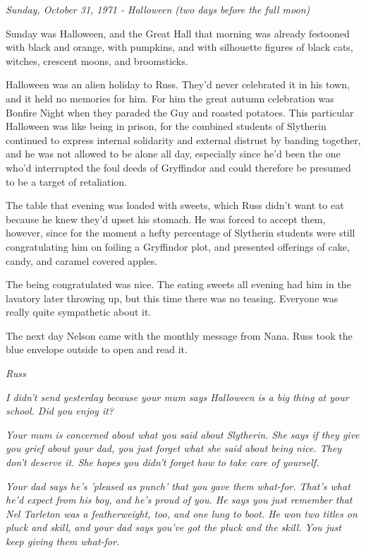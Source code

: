 \documentclass[a4paper,11pt]{article}
\begin{document}
\emph{Sunday, October 31, 1971 - Halloween (two days before the full moon)}

Sunday was Halloween, and the Great Hall that morning was already festooned with black and orange, with pumpkins, and with silhouette figures of black cats, witches, crescent moons, and broomsticks.

Halloween was an alien holiday to Russ. They'd never celebrated it in his town, and it held no memories for him. For him the great autumn celebration was Bonfire Night when they paraded the Guy and roasted potatoes. This particular Halloween was like being in prison, for the combined students of Slytherin continued to express internal solidarity and external distrust by banding together, and he was not allowed to be alone all day, especially since he'd been the one who'd interrupted the foul deeds of Gryffindor and could therefore be presumed to be a target of retaliation.

The table that evening was loaded with sweets, which Russ didn't want to eat because he knew they'd upset his stomach. He was forced to accept them, however, since for the moment a hefty percentage of Slytherin students were still congratulating him on foiling a Gryffindor plot, and presented offerings of cake, candy, and caramel covered apples.

The being congratulated was nice. The eating sweets all evening had him in the lavatory later throwing up, but this time there was no teasing. Everyone was really quite sympathetic about it.

The next day Nelson came with the monthly message from Nana. Russ took the blue envelope outside to open and read it.

\emph{Russ}

\emph{I didn't send yesterday because your mum says Halloween is a big thing at your school. Did you enjoy it?}

\emph{Your mum is concerned about what you said about Slytherin. She says if they give you grief about your dad, you just forget what she said about being nice. They don't deserve it. She hopes you didn't forget how to take care of yourself.}

\emph{Your dad says he's 'pleased as punch' that you gave them what-for. That's what he'd expect from his boy, and he's proud of you. He says you just remember that Nel Tarleton was a featherweight, too, and one lung to boot. He won two titles on pluck and skill, and your dad says you've got the pluck and the skill. You just keep giving them what-for.}
\end{document}
